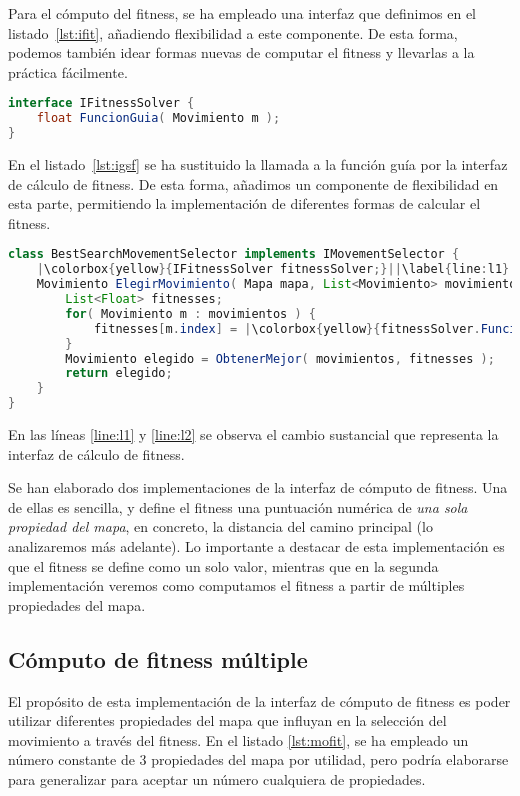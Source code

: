 Para el cómputo del fitness, se ha empleado una interfaz que definimos en el listado~\ref{lst:ifit}, añadiendo flexibilidad a este componente. De esta forma, podemos también idear formas nuevas de computar el fitness y llevarlas a la práctica fácilmente.

\begin{lstlisting}[caption={Interfaz de cómputo de fitness},label={lst:ifit},language=Java]
interface IFitnessSolver {
	float FuncionGuia( Movimiento m );
}
\end{lstlisting}

En el listado~\ref{lst:igsf} se ha sustituido la llamada a la función guía por la interfaz de cálculo de fitness. De esta forma, añadimos un componente de flexibilidad en esta parte, permitiendo la implementación de diferentes formas de calcular el fitness.

\begin{lstlisting}[caption={Interfaz de selección de movimiento basada en búsqueda},label={lst:igsf},language=Java,escapechar=|]
class BestSearchMovementSelector implements IMovementSelector {
	|\colorbox{yellow}{IFitnessSolver fitnessSolver;}||\label{line:l1}|
	Movimiento ElegirMovimiento( Mapa mapa, List<Movimiento> movimientos ) {
		List<Float> fitnesses;
		for( Movimiento m : movimientos ) {
			fitnesses[m.index] = |\colorbox{yellow}{fitnessSolver.FuncionGuia( mapa, m );}||\label{line:l2}|
		}
		Movimiento elegido = ObtenerMejor( movimientos, fitnesses );
		return elegido;
	}
}
\end{lstlisting}

En las líneas \ref{line:l1} y \ref{line:l2} se observa el cambio sustancial que representa la interfaz de cálculo de fitness.

Se han elaborado dos implementaciones de la interfaz de cómputo de fitness. Una de ellas es sencilla, y define el fitness una puntuación numérica de \emph{una sola propiedad del mapa}, en concreto, la distancia del camino principal (lo analizaremos más adelante). Lo importante a destacar de esta implementación es que el fitness se define como un solo valor, mientras que en la segunda implementación veremos como computamos el fitness a partir de múltiples propiedades del mapa.

\subsection{Cómputo de fitness múltiple}
 \label{fitmultsec}

El propósito de esta implementación de la interfaz de cómputo de fitness es poder utilizar diferentes propiedades del mapa que influyan en la selección del movimiento a través del fitness. En el listado \ref{lst:mofit}, se ha empleado un número constante de 3 propiedades del mapa por utilidad, pero podría elaborarse para generalizar para aceptar un número cualquiera de propiedades.

